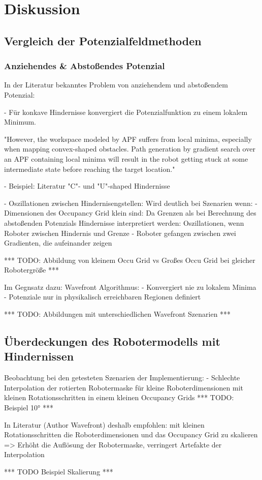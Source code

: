 \chapter{Diskussion}

\section{Vergleich der Potenzialfeldmethoden}

\subsection*{Anziehendes \& Abstoßendes Potenzial}

In der Literatur bekanntes Problem von anziehendem und abstoßendem Potenzial: 


- Für konkave Hindernisse konvergiert die Potenzialfunktion zu einem lokalem Minimum.

"However, the workspace modeled by APF suffers from local minima, especially when mapping convex-shaped obstacles. Path generation by gradient search over an APF containing local minima will result in the robot getting stuck at some intermediate state before reaching the target location." \cite{maqbool.2021}

	- Beispiel: Literatur "C"- und "U"-shaped Hindernisse \cite{yujiang.2017}


- Oszillationen zwischen Hindernisengstellen:
	Wird deutlich bei Szenarien wenn:
	- Dimensionen des Occupancy Grid klein sind: Da Grenzen als bei Berechnung des abstoßenden Potenzials Hindernisse interpretiert werden: Oszillationen, wenn Roboter zwischen Hindernis und Grenze
	- Roboter gefangen zwischen zwei Gradienten, die aufeinander zeigen

*** TODO: Abbildung von kleinem Occu Grid vs Großes Occu Grid bei gleicher Robotergröße ***


Im Gegnsatz dazu: Wavefront Algorithmus: 
	- Konvergiert nie zu lokalem Minima
	- Potenziale nur in physikalisch erreichbaren Regionen definiert

*** TODO: Abbildungen mit unterschiedlichen Wavefront Szenarien ***


\section{Überdeckungen des Robotermodells mit Hindernissen}

Beobachtung bei den getesteten Szenarien der Implementierung: 
- Schlechte Interpolation der rotierten Robotermaske für kleine Roboterdimensionen mit kleinen Rotationsschritten in einem kleinen Occupancy Grids
 *** TODO: Beispiel 10° ***

In Literatur (Author Wavefront) deshalb empfohlen: mit kleinen Rotationsschritten die Roboterdimensionen und das Occupancy Grid zu skalieren
=> Erhöht die Auflösung der Robotermaske, verringert Artefakte der Interpolation

*** TODO Beispiel Skalierung ***